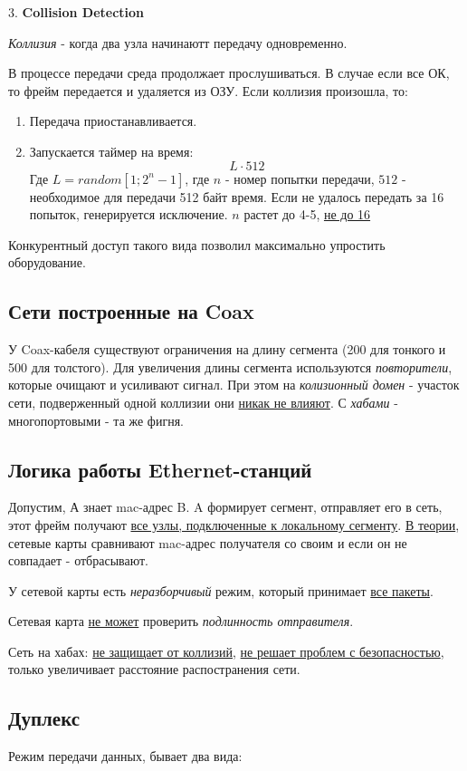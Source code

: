 \documentclass[a4paper,10pt]{article}
\begin{document}
	3. \textbf{Collision Detection} 
	
	\emph{Коллизия} - когда два узла начинаютт передачу одновременно.
	
	В процессе передачи среда продолжает прослушиваться. В случае если все ОК, то фрейм передается и удаляется из ОЗУ. Если коллизия произошла, то:
	\begin{enumerate}
		\item Передача приостанавливается.
		\item Запускается таймер на время: 
		\[ L\cdot 512 \]
		Где $ L=random[1;2^n-1] $, где $ n $ - номер попытки передачи, $ 512 $ - необходимое для передачи 512 байт время.
		Если не удалось передать за 16 попыток, генерируется исключение. $ n $ растет до 4-5, \underline{не до 16}
	\end{enumerate}
	Конкурентный доступ такого вида позволил максимально упростить оборудование.
	
	\subsection{Сети построенные на Coax}
	
	У Coax-кабеля существуют ограничения на длину сегмента (200 для тонкого и 500 для толстого). Для увеличения длины сегмента используются \emph{повторители}, которые очищают и усиливают сигнал. При этом на \emph{колизионный домен} - участок сети, подверженный одной коллизии они \underline{никак не влияют}. С \emph{хабами} - многопортовыми - та же фигня.
	
	\subsection{Логика работы Ethernet-станций}
	Допустим, А знает mac-адрес B. A формирует сегмент, отправляет его в сеть, этот фрейм получают \underline{все узлы, подключенные к локальному сегменту}. \underline{В теории}, сетевые карты сравнивают mac-адрес получателя со своим и если он не совпадает - отбрасывают.
	
	У сетевой карты есть \emph{неразборчивый} режим, который принимает \underline{все пакеты}.
	
	Сетевая карта \underline{не может} проверить \emph{подлинность отправителя}.
	
	Сеть на хабах: \underline{не защищает от коллизий}, \underline{не решает проблем с безопасностью}, только увеличивает расстояние распостранения сети.
	
	\subsection{Дуплекс}
	Режим передачи данных, бывает два вида:
	
\end{document}
